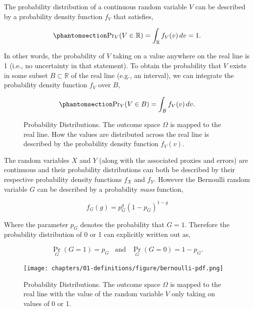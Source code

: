 \documentclass[
  letterpaper,
  DIV=11,
  numbers=noendperiod]{scrreprt}
\begin{document}
The probability distribution of a continuous random variable \(V\) can
be described by a probability density function \(f_V\) that satisfies,

\begin{equation}\phantomsection\label{eq-pdf-1}{
{\Pr}_V(V\in\mathbb{R}) = \int_\mathbb{R} f_V(v)\, dv = 1.
}\end{equation}

In other words, the probability of \(V\) taking on a value anywhere on
the real line is 1 (i.e., no uncertainty in that statement). To obtain
the probability that \(V\) exists in some subset
\(B \subset \mathbb{R}\) of the real line (e.g., an interval), we can
integrate the probability density function \(f_V\) over \(B\),

\begin{equation}\phantomsection\label{eq-pdf-2}{
{\Pr}_V(V\in B) = \int_{B} f_V(v)\, dv.
}\end{equation}

\begin{figure}[H]


\caption{\label{fig-pdf}Probability Distributions. The outcome space
\(\Omega\) is mapped to the real line. How the values are distributed
across the real line is described by the probability density function
\(f_{V}(v)\).}

\end{figure}%

The random variables \(X\) and \(Y\) (along with the associated proxies
and errors) are continuous and their probability distributions can both
be described by their respective probability density functions \(f_X\)
and \(f_Y\). However the Bernoulli random variable \(G\) can be
described by a probability \emph{mass} function,

\[
f_G(g) = p_G^g (1-p_G)^{1-g}
\]

Where the parameter \(p_G\) denotes the probability that \(G=1\).
Therefore the probability distribution of 0 or 1 can explicitly written
out as,

\[
{\Pr}_G(G = 1) = p_G \;\;\; \text{and} \;\;\;
{\Pr}_G(G = 0) = 1-p_G.
\]

\begin{figure}[H]

{\centering \texttt{[image: chapters/01-definitions/figure/bernoulli-pdf.png]}

}

\caption{Probability Distributions. The outcome space \(\Omega\) is
mapped to the real line with the value of the random variable \(V\) only
taking on values of 0 or 1.}

\end{figure}%
\end{document}
